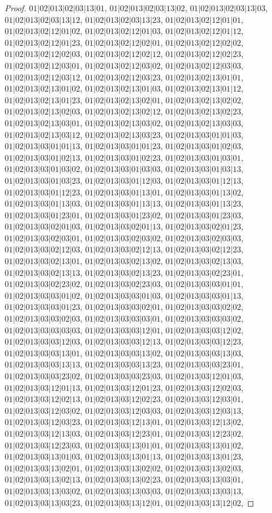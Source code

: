 \documentclass[12pt]{article}
\theoremstyle{plain}
\theoremstyle{definition}
\theoremstyle{remark}
\begin{document}
\begin{proof}
$01|02|013|02|03|13|01$, $01|02|013|02|03|13|02$, $01|02|013|02|03|13|03$, $01|02|013|02|03|13|12$, $01|02|013|02|03|13|23$, $01|02|013|02|12|01|01$, $01|02|013|02|12|01|02$, $01|02|013|02|12|01|03$, $01|02|013|02|12|01|12$, $01|02|013|02|12|01|23$, $01|02|013|02|12|02|01$, $01|02|013|02|12|02|02$, $01|02|013|02|12|02|03$, $01|02|013|02|12|02|12$, $01|02|013|02|12|02|23$, $01|02|013|02|12|03|01$, $01|02|013|02|12|03|02$, $01|02|013|02|12|03|03$, $01|02|013|02|12|03|12$, $01|02|013|02|12|03|23$, $01|02|013|02|13|01|01$, $01|02|013|02|13|01|02$, $01|02|013|02|13|01|03$, $01|02|013|02|13|01|12$, $01|02|013|02|13|01|23$, $01|02|013|02|13|02|01$, $01|02|013|02|13|02|02$, $01|02|013|02|13|02|03$, $01|02|013|02|13|02|12$, $01|02|013|02|13|02|23$, $01|02|013|02|13|03|01$, $01|02|013|02|13|03|02$, $01|02|013|02|13|03|03$, $01|02|013|02|13|03|12$, $01|02|013|02|13|03|23$, $01|02|013|03|01|01|03$, $01|02|013|03|01|01|13$, $01|02|013|03|01|01|23$, $01|02|013|03|01|02|03$, $01|02|013|03|01|02|13$, $01|02|013|03|01|02|23$, $01|02|013|03|01|03|01$, $01|02|013|03|01|03|02$, $01|02|013|03|01|03|03$, $01|02|013|03|01|03|13$, $01|02|013|03|01|03|23$, $01|02|013|03|01|12|03$, $01|02|013|03|01|12|13$, $01|02|013|03|01|12|23$, $01|02|013|03|01|13|01$, $01|02|013|03|01|13|02$, $01|02|013|03|01|13|03$, $01|02|013|03|01|13|13$, $01|02|013|03|01|13|23$, $01|02|013|03|01|23|01$, $01|02|013|03|01|23|02$, $01|02|013|03|01|23|03$, $01|02|013|03|02|01|03$, $01|02|013|03|02|01|13$, $01|02|013|03|02|01|23$, $01|02|013|03|02|03|01$, $01|02|013|03|02|03|02$, $01|02|013|03|02|03|03$, $01|02|013|03|02|12|03$, $01|02|013|03|02|12|13$, $01|02|013|03|02|12|23$, $01|02|013|03|02|13|01$, $01|02|013|03|02|13|02$, $01|02|013|03|02|13|03$, $01|02|013|03|02|13|13$, $01|02|013|03|02|13|23$, $01|02|013|03|02|23|01$, $01|02|013|03|02|23|02$, $01|02|013|03|02|23|03$, $01|02|013|03|03|01|01$, $01|02|013|03|03|01|02$, $01|02|013|03|03|01|03$, $01|02|013|03|03|01|13$, $01|02|013|03|03|01|23$, $01|02|013|03|03|02|01$, $01|02|013|03|03|02|02$, $01|02|013|03|03|02|03$, $01|02|013|03|03|03|01$, $01|02|013|03|03|03|02$, $01|02|013|03|03|03|03$, $01|02|013|03|03|12|01$, $01|02|013|03|03|12|02$, $01|02|013|03|03|12|03$, $01|02|013|03|03|12|13$, $01|02|013|03|03|12|23$, $01|02|013|03|03|13|01$, $01|02|013|03|03|13|02$, $01|02|013|03|03|13|03$, $01|02|013|03|03|13|13$, $01|02|013|03|03|13|23$, $01|02|013|03|03|23|01$, $01|02|013|03|03|23|02$, $01|02|013|03|03|23|03$, $01|02|013|03|12|01|03$, $01|02|013|03|12|01|13$, $01|02|013|03|12|01|23$, $01|02|013|03|12|02|03$, $01|02|013|03|12|02|13$, $01|02|013|03|12|02|23$, $01|02|013|03|12|03|01$, $01|02|013|03|12|03|02$, $01|02|013|03|12|03|03$, $01|02|013|03|12|03|13$, $01|02|013|03|12|03|23$, $01|02|013|03|12|13|01$, $01|02|013|03|12|13|02$, $01|02|013|03|12|13|03$, $01|02|013|03|12|23|01$, $01|02|013|03|12|23|02$, $01|02|013|03|12|23|03$, $01|02|013|03|13|01|01$, $01|02|013|03|13|01|02$, $01|02|013|03|13|01|03$, $01|02|013|03|13|01|13$, $01|02|013|03|13|01|23$, $01|02|013|03|13|02|01$, $01|02|013|03|13|02|02$, $01|02|013|03|13|02|03$, $01|02|013|03|13|02|13$, $01|02|013|03|13|02|23$, $01|02|013|03|13|03|01$, $01|02|013|03|13|03|02$, $01|02|013|03|13|03|03$, $01|02|013|03|13|03|13$, $01|02|013|03|13|03|23$, $01|02|013|03|13|12|01$, $01|02|013|03|13|12|02$, 
\end{proof}
\end{document}
